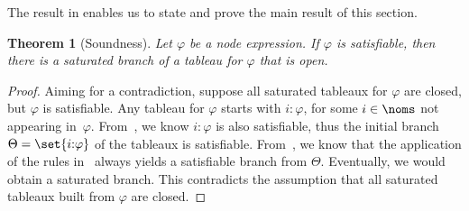 \documentclass[10pt,a4paper]{amsart}
\newtheorem{thm}{Theorem}[section]
\theoremstyle{definition}
\theoremstyle{remark}
\begin{document}
The result in  enables us to state and prove the main result of this section.

\begin{thm}[Soundness]
    \label{thm:soundness}
    Let $\varphi$ be a node expression. If $\varphi$ is satisfiable, then there is a saturated branch of a tableau for $\varphi$ that is open.
\end{thm}

\begin{proof}
    Aiming for a contradiction, suppose all saturated tableaux for $\varphi$ are closed, but $\varphi$ is satisfiable. Any tableau for $\varphi$ starts with $i{:}\varphi$, for some $i\in\noms$ not appearing in~$\varphi$.
    From~, we know $i{:}{\varphi}$ is also satisfiable, thus the initial branch $\Theta=\set{i{:}\varphi}$ of the tableaux is satisfiable. 
    From~, we know that the application of the rules in~ always yields a satisfiable branch from $\Theta$.
    Eventually, we would obtain a saturated branch.
    This contradicts the assumption that all saturated tableaux built from $\varphi$ are closed.
\end{proof}




\end{document}
